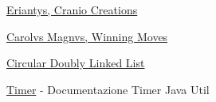 \documentclass[a4paper, 12pt]{article}
\begin{document}
	\newpage
	\begin{thebibliography}{99}
		\href{https://www.craniocreations.it/prodotto/eriantys/}{Eriantys, Cranio Creations}
		
		\href{https://www.goblins.net/giochi/carolus-magnus-5071}{Carolvs Magnvs, Winning Moves}
		
		\href{https://www.softwaretestinghelp.com/doubly-linked-list-in-java/#Circular_Doubly_Linked_List_In_Java}{Circular Doubly Linked List}
		
		\href{https://docs.oracle.com/javase/7/docs/api/java/util/Timer.html}{Timer} - Documentazione Timer Java Util
		
	\end{thebibliography} 
\end{document}
